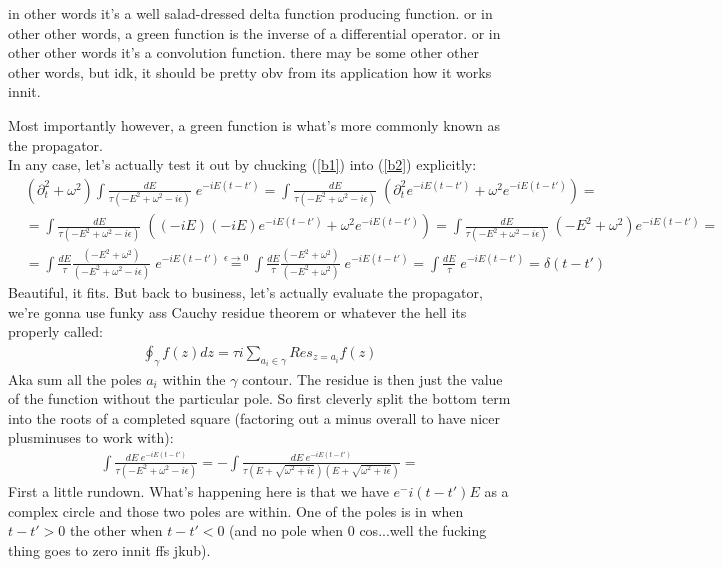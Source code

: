\documentclass[10pt]{article}
\begin{document}
in other words it's a well salad-dressed delta function producing function. or in other other words, a green function is the inverse of a differential operator. or in other other words it's a convolution function. there may be some other other other words, but idk, it should be pretty obv from its application how it works innit. \par
Most importantly however, a green function is what's more commonly known as the propagator. \\
In any case, let's actually test it out by chucking (\ref{b1}) into (\ref{b2}) explicitly:
\begin{align}
	&(\partial_{t}^2 + \omega^2) \int \frac{dE}{\tau(-E^2+\omega^2-i\epsilon)} \; e^{-iE(t-t')} = \int \frac{dE}{\tau(-E^2+\omega^2-i\epsilon)} \; \left(\partial_{t}^2e^{-iE(t-t')} + \omega^2e^{-iE(t-t')}\right) = \\[1.5ex]
	&= \int \frac{dE}{\tau(-E^2+\omega^2-i\epsilon)} \; \left((-iE)(-iE)e^{-iE(t-t')} + \omega^2e^{-iE(t-t')}\right) = \int \frac{dE}{\tau(-E^2+\omega^2-i\epsilon)} \; \left(-E^2 + \omega^2\right)e^{-iE(t-t')} = \\[1.5ex]
	&=  \int \frac{dE}{\tau} \frac{\left(-E^2 + \omega^2\right)}{(-E^2+\omega^2-i\epsilon)} \; e^{-iE(t-t')}\stackrel{\epsilon \rightarrow 0}{=} \int \frac{dE}{\tau} \frac{\left(-E^2 + \omega^2\right)}{(-E^2+\omega^2)} \; e^{-iE(t-t')} = \int \frac{dE}{\tau} \; e^{-iE(t-t')} = \delta(t-t')
\end{align}
Beautiful, it fits. But back to business, let's actually evaluate the propagator, we're gonna use funky ass Cauchy residue theorem or whatever the hell its properly called:
\begin{align}
\oint_{\gamma} f(z)dz = \tau i \sum_{a_i \in \gamma} Res_{z=a_i} f(z)
\end{align}
Aka sum all the poles $a_i$ within the $\gamma$ contour. The residue is then just the value of the function without the particular pole. So first cleverly split the bottom term into the roots of a completed square (factoring out a minus overall to have nicer plusminuses to work with):
\begin{align}
	\int \frac{dE\; e^{-iE(t-t')}}{\tau(-E^2+\omega^2-i\epsilon)}  = -\int \frac{dE \; e^{-iE(t-t')}}{\tau\left( E + \sqrt{\omega^2 + i\epsilon}\right)\left( E + \sqrt{\omega^2 + i\epsilon}\right)}=
\end{align}
First a little rundown. What's happening here is that we have $e^-i(t-t')E$ as a complex circle and those two poles are within. One of the poles is in when $t-t' > 0$ the other when $t-t' <0$ (and no pole when 0 cos...well the fucking thing goes to zero innit ffs jkub).\par
\end{document}
